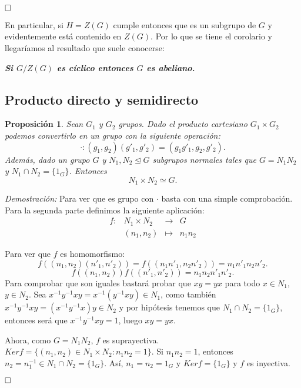 \documentclass[12pt]{article}
\newtheorem{proposition}[theorem]{Proposición}
\begin{document}
$\hfill \square$

En particular, si $H=Z(G)$ cumple entonces que es un subgrupo de $G$ y evidentemente está contenido en $Z(G)$. Por lo que se tiene el corolario y llegaríamos al resultado que suele conocerse: 

\begin{center}\textbf{\textit{Si $G/Z(G)$ es cíclico entonces $G$ es abeliano.}}\end{center}

\subsection{Producto directo y semidirecto}

\begin{proposition}Sean $G_{1}$ y $G_{2}$ grupos. Dado el producto cartesiano $G_{1} \times G_{2}$ podemos convertirlo en un grupo con la siguiente operación: $$\cdot \colon (g_{1},g_{2})(g'_{1},g'_{2})=(g_{1}g'_{1},g_{2},g'_{2}).$$
Además, dado un grupo $G$ y $N_{1},N_{2} \unlhd G$ subgrupos normales tales que $G=N_{1}N_{2}$ y $N_{1}\cap N_{2}=\lbrace 1_{G} \rbrace$. Entonces $$N_{1} \times N_{2} \simeq G.$$
\end{proposition}
\emph{Demostración: }Para ver que es grupo con $\cdot$ basta con una simple comprobación. Para la segunda parte definimos la siguiente aplicación: 
$$\begin{array}{rccl}
f\colon &N_{1}\times N_{2} & \longrightarrow & G\\
&(n_{1},n_{2})& \longmapsto &n_{1}n_{2}
\end{array}
$$ 

Para ver que $f$ es homomorfismo: $$f((n_{1},n_{2})(n'_{1},n'_{2}))=f((n_{1}n'_{1},n_{2}n'_{2}))=n_{1}n'_{1}n_{2}n'_{2}.$$
$$f((n_{1},n_{2}))f((n'_{1},n'_{2}))=n_{1}n_{2}n'_{1}n'_{2}.$$
Para comprobar que son iguales bastará probar que $xy=yx$ para todo $x\in N_{1}$, $y\in N_{2}$. Sea $x^{-1}y^{-1}xy=x^{-1}(y^{-1}xy)\in N_{1}$, como también $x^{-1}y^{-1}xy=(x^{-1}y^{-1}x)y \in N_{2}$ y por hipótesis tenemos que $N_{1}\cap N_{2} = \lbrace 1_{G}\rbrace$, entonces será que $x^{-1}y^{-1}xy=1$, luego $xy=yx$. 

Ahora, como $G=N_{1}N_{2}$, $f$ es suprayectiva. $Ker f = \lbrace (n_{1},n_{2}) \in N_{1}\times N_{2}:n_{1}n_{2}=1 \rbrace$. Si $n_{1}n_{2}=1$, entonces $n_{2}=n_{1}^{-1}\in N_{1}\cap N_{2}=\lbrace 1_{G}\rbrace$. Así, $n_{1}=n_{2}=1_{G}$ y $Ker f=\lbrace 1_{G} \rbrace$ y $f$ es inyectiva.

$\hfill \square$
\end{document}
